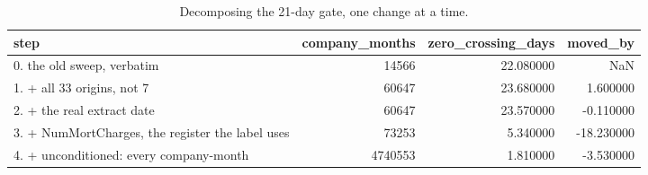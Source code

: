 \begin{table}
\caption{Decomposing the 21-day gate, one change at a time.}
\label{tab:nb16_margin_sweep_ladder}
\begin{tabular}{lrrr}
\toprule
step & company_months & zero_crossing_days & moved_by \\
\midrule
0. the old sweep, verbatim & 14566 & 22.080000 & NaN \\
1. + all 33 origins, not 7 & 60647 & 23.680000 & 1.600000 \\
2. + the real extract date & 60647 & 23.570000 & -0.110000 \\
3. + NumMortCharges, the register the label uses & 73253 & 5.340000 & -18.230000 \\
4. + unconditioned: every company-month & 4740553 & 1.810000 & -3.530000 \\
\bottomrule
\end{tabular}
\end{table}
